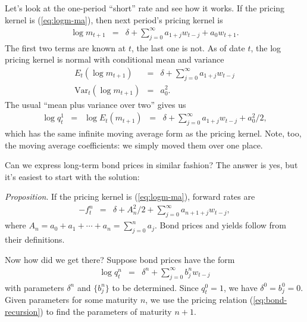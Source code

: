 \documentclass[11pt]{article}
\begin{document}
Let's look at the one-period ``short'' rate and see how it works.
If the pricing kernel is (\ref{eq:logm-ma}),
then next period's pricing kernel is
\begin{eqnarray*}
    \log m_{t+1} &=& \delta + \sum_{j=0}^\infty a_{1+j} w_{t-j} + a_0 w_{t+1} .
\end{eqnarray*}
The first two terms are known at $t$, the last one is not.
As of date $t$, the log pricing kernel is normal with conditional mean and variance
\begin{eqnarray*}
    E_t ( \log m_{t+1}) &=& \delta + \sum_{j=0}^\infty a_{1+j} w_{t-j} \\
    \mbox{Var}_t ( \log m_{t+1}) &=& a_0^2 .
\end{eqnarray*}
The usual ``mean plus variance over two'' gives us
\begin{eqnarray*}
    \log q^1_t &=& \log E_t \left(m_{t+1}\right)
            \;\;=\;\; \delta + \sum_{j=0}^\infty a_{1+j} w_{t-j} + a_0^2/2 ,
\end{eqnarray*}
which has the same infinite moving average form as the pricing kernel.
Note, too, the moving average coefficients:
we simply moved them over one place.


Can we express long-term bond prices in similar fashion?
The answer is yes,
but it's easiest to start with the solution:

{\it Proposition\/}.  If the pricing kernel is (\ref{eq:logm-ma}),
forward rates are
\begin{eqnarray}
    - f^n_t &=& \delta + A_n^2/2 + \sum_{j=0}^\infty a_{n+1+j} w_{t-j} ,
\end{eqnarray}
where $A_n = a_0 + a_1 + \cdots + a_n = \sum_{j=0}^n a_j $.
Bond prices and yields follow from their definitions.

Now how did we get there?
Suppose bond prices have the form
\begin{eqnarray*}
    \log q^n_t &=& \delta^n + \sum_{j=0}^\infty b^n_{j} w_{t-j}
\end{eqnarray*}
with parameters $\delta^n$ and $\{b^n_j \}$ to be determined.
Since $q^0_t = 1$, we have $\delta^0 =b^0_j = 0$.
Given parameters for some maturity $n$,
we use the pricing relation (\ref{eq:bond-recursion})
to find the parameters of maturity $n+1$.
\end{document}
